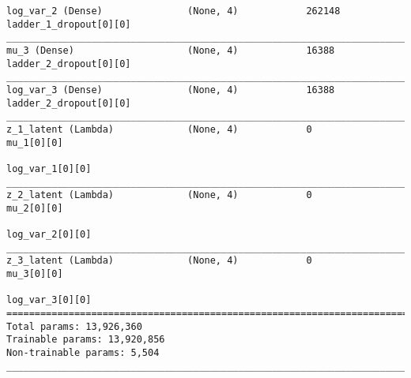 \begin{lstlisting}[caption={dSprites-\ac{VLAE} Encoder},captionpos=b,basicstyle=\tiny, label={lst:dsprites-vlae-encoder}]
log_var_2 (Dense)               (None, 4)            262148      ladder_1_dropout[0][0]
__________________________________________________________________________________________________
mu_3 (Dense)                    (None, 4)            16388       ladder_2_dropout[0][0]
__________________________________________________________________________________________________
log_var_3 (Dense)               (None, 4)            16388       ladder_2_dropout[0][0]
__________________________________________________________________________________________________
z_1_latent (Lambda)             (None, 4)            0           mu_1[0][0]
                                                                 log_var_1[0][0]
__________________________________________________________________________________________________
z_2_latent (Lambda)             (None, 4)            0           mu_2[0][0]
                                                                 log_var_2[0][0]
__________________________________________________________________________________________________
z_3_latent (Lambda)             (None, 4)            0           mu_3[0][0]
                                                                 log_var_3[0][0]
==================================================================================================
Total params: 13,926,360
Trainable params: 13,920,856
Non-trainable params: 5,504
__________________________________________________________________________________________________
\end{lstlisting}